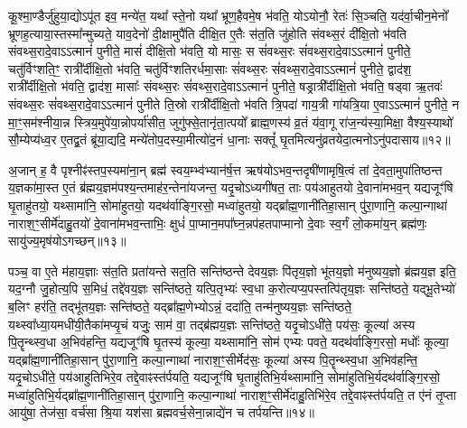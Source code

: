 कू॒श्मा॒ण्डैर्जु॑हुया॒द्योऽपू॑त इव॒ मन्ये॑त॒ यथा᳚ स्ते॒नो यथा᳚ भ्रूण॒हैवमे॒ष भ॑वति॒ योऽयोनौ॒ रेतः॑ सि॒ञ्चति॒ यद॑र्वा॒चीन॒मेनो᳚ भ्रूणह॒त्याया॒स्तस्मा᳚न्मुच्यते॒ याव॒देनो॑ दी॒क्षामुपै॑ति दीक्षि॒त ए॒तैः स॑त॒ति जु॑होति संवथ्स॒रं दी᳚क्षि॒तो भ॑वति संवथ्स॒रादे॒वाऽऽत्मानं॑ पुनीते॒ मासं॑ दीक्षि॒तो भ॑वति॒ यो मासः॒ स सं॑वथ्स॒रः सं॑वथ्स॒रादे॒वाऽऽत्मानं॑ पुनीते॒ चतु॑र्विꣳशति॒ꣳ॒ रात्री᳚र्दीक्षि॒तो भ॑वति॒ चतु॑र्विꣳशतिरर्धमा॒साः सं॑वथ्स॒रः सं॑वथ्स॒रादे॒वाऽऽत्मानं॑ पुनीते॒ द्वाद॑श॒ रात्री᳚र्दीक्षि॒तो भ॑वति॒ द्वाद॑श॒ मासाः᳚ संवथ्स॒रः सं॑वथ्स॒रादे॒वाऽऽत्मानं॑ पुनीते॒ षड्रात्री᳚र्दीक्षि॒तो भ॑वति॒ षड्वा ऋ॒तवः॑ संवथ्स॒रः सं॑वथ्स॒रादे॒वाऽऽत्मानं॑ पुनीते ति॒स्रो रात्री᳚र्दीक्षि॒तो भ॑वति त्रि॒पदा॑ गाय॒त्री गा॑यत्रि॒या ए॒वाऽऽत्मानं॑ पुनीते॒ न मा॒ꣳ॒सम॑श्नीया॒न्न स्त्रिय॒मुपे॑या॒न्नोपर्या॑सीत॒ जुगु॑फ्से॒तानृ॑ता॒त्पयो᳚ ब्राह्म॒णस्य॑ व्र॒तं य॑वा॒गू रा॑ज॒न्य॑स्या॒मिक्षा॒ वैश्य॒स्याथो॑ सौ॒म्येप्य॑ध्व॒र ए॒तद्व्र॒तं ब्रू॑या॒द्यदि॒ मन्ये॑तोप॒दस्या॒मीत्यो॑द॒नं धा॒नाः सक्तूं᳚ घृ॒तमित्यनु॑व्रतयेदा॒त्मनोऽनु॑पदासाय॥१२॥ 
\anuvakamend

अ॒जान् ह॒ वै पृश्नीꣴ॑स्तप॒स्यमा॑ना॒न् ब्रह्म॑ स्वय॒म्भ्व॑भ्यान॑र्\mbox{}ष॒त्त ऋष॑योऽभव॒न्तदृषी॑णामृषि॒त्वं तां दे॒वता॒मुपा॑तिष्ठन्त य॒ज्ञका॑मा॒स्त ए॒तं ब्र॑ह्मय॒ज्ञम॑पश्य॒न्तमाह॑र॒न्तेना॑यजन्त॒ यदृ॒चोऽध्यगी॑षत॒ ताः पय॑आहुतयो दे॒वाना॑मभव॒न् यद्यजूꣳ॑षि घृ॒ताहु॑तयो॒ यथ्सामा॑नि॒ सोमा॑हुतयो॒ यदथ॑र्वाङ्गि॒रसो॒ मध्वा॑हुतयो॒ यद्ब्रा᳚ह्म॒णानी॑तिहा॒सान् पु॑रा॒णानि॒ कल्पा॒न्गाथा॑ नाराश॒ꣳ॒सीर्मे॑दाहु॒तयो॑ दे॒वाना॑मभव॒न्ताभिः॒ क्षुधं॑ पा॒प्मान॒म\-पा᳚घ्न॒न्नप॑हतपाप्मानो दे॒वाः स्व॒र्गं लो॒कमा॑य॒न् ब्रह्म॑णः॒ सायु॑ज्य॒मृष॑योऽगच्छन्॥१३॥\anuvakamend

पञ्च॒ वा ए॒ते म॑हाय॒ज्ञाः स॑त॒ति प्रता॑यन्ते सत॒ति सन्ति॑ष्ठन्ते देवय॒ज्ञः पि॑तृय॒ज्ञो भू॑तय॒ज्ञो म॑नुष्यय॒ज्ञो ब्र॑ह्मय॒ज्ञ इति॒ यद॒ग्नौ जु॒होत्य॒पि स॒मिधं॒ तद्दे॑वय॒ज्ञः सन्ति॑ष्ठते॒ यत्पि॒तृभ्यः॑ स्व॒धा क॒रोत्यप्य॒पस्तत्पि॑तृय॒ज्ञः सन्ति॑ष्ठते॒ यद्भू॒तेभ्यो॑ ब॒लिꣳ हर॑ति॒ तद्भू॑तय॒ज्ञः सन्ति॑ष्ठते॒ यद्ब्रा᳚ह्म॒णेभ्योऽन्नं॒ ददा॑ति॒ तन्म॑नुष्यय॒ज्ञः सन्ति॑ष्ठते॒ यथ्स्वा᳚ध्या॒यमधी॑यी॒तैका॑मप्यृ॒चं यजुः॒ साम॑ वा॒ तद्ब्र॑ह्मय॒ज्ञः सन्ति॑ष्ठते॒ यदृ॒चोऽधी॑ते॒ पय॑सः॒ कूल्या॑ अस्य पि॒तॄन्थ्स्व॒धा अ॒भिव॑हन्ति॒ यद्यजूꣳ॑षि घृ॒तस्य॑ कूल्या॒ यथ्सामा॑नि॒ सोम॑ एभ्यः पवते॒ यदथ॑र्वाङ्गि॒रसो॒ मधोः᳚ कूल्या॒ यद्ब्रा᳚ह्म॒णानी॑तिहा॒सान् पु॑रा॒णानि॒ कल्पा॒न्गाथा॑ नाराश॒ꣳ॒सीर्मेद॑सः॒ कूल्या॑ अस्य पि॒तॄन्थ्स्व॒धा अ॒भिव॑हन्ति॒ यदृ॒चोऽधी॑ते॒ पय॑आहुतिभिरे॒व तद्दे॒वाꣴस्त॑र्पयति॒ यद्यजूꣳ॑षि घृ॒ताहु॑तिभि॒र्यथ्सामा॑नि॒ सोमा॑हुतिभि॒र्यदथ॑र्वाङ्गि॒रसो॒ मध्वा॑\-हुतिभि॒र्यद्ब्रा᳚ह्म॒णानी॑तिहा॒सान् पु॑रा॒णानि॒ कल्पा॒न्गाथा॑ नाराश॒ꣳ॒सीर्मे॑दाहु॒तिभि॑रे॒व तद्दे॒वाꣴस्त॑र्पयति॒ त ए॑नं तृ॒प्ता आयु॑षा॒ तेज॑सा॒ वर्च॑सा श्रि॒या यश॑सा ब्रह्मवर्च॒सेना॒न्नाद्ये॑न च तर्पयन्ति॥१४॥
\anuvakamend


